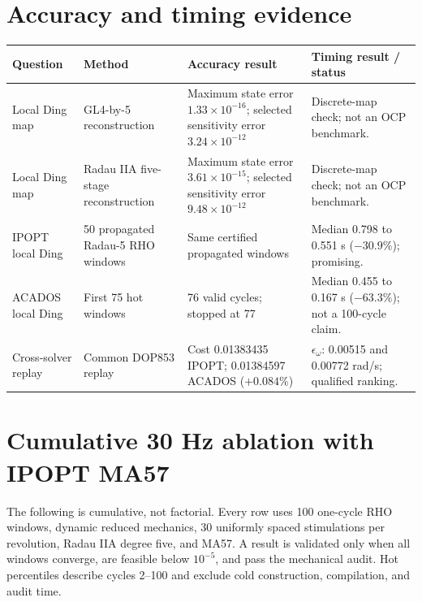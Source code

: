 \documentclass[10pt]{article}
\begin{document}
\section{Accuracy and timing evidence}

\begin{longtable}{@{}p{}p{}p{}p{}@{}}
\toprule
Question & Method & Accuracy result & Timing result / status\\
\midrule
\endhead
Local Ding map & GL4-by-5 reconstruction & Maximum state error $1.33\times10^{-16}$; selected sensitivity error $3.24\times10^{-12}$ & Discrete-map check; not an OCP benchmark.\\
Local Ding map & Radau IIA five-stage reconstruction & Maximum state error $3.61\times10^{-15}$; selected sensitivity error $9.48\times10^{-12}$ & Discrete-map check; not an OCP benchmark.\\
IPOPT local Ding & 50 propagated Radau-5 RHO windows & Same certified propagated windows & Median 0.798 to 0.551 s ($-30.9\%$); promising.\\
ACADOS local Ding & First 75 hot windows & 76 valid cycles; stopped at 77 & Median 0.455 to 0.167 s ($-63.3\%$); not a 100-cycle claim.\\
Cross-solver replay & Common DOP853 replay & Cost 0.01383435 IPOPT; 0.01384597 ACADOS ($+0.084\%$) & $\epsilon_\omega$: 0.00515 and 0.00772 rad/s; qualified ranking.\\
\bottomrule
\end{longtable}

\section{Cumulative 30 Hz ablation with IPOPT MA57}

The following is cumulative, not factorial. Every row uses 100 one-cycle RHO windows, dynamic reduced mechanics, 30 uniformly spaced stimulations per revolution, Radau IIA degree five, and MA57. A result is validated only when all windows converge, are feasible below $10^{-5}$, and pass the mechanical audit. Hot percentiles describe cycles 2--100 and exclude cold construction, compilation, and audit time.
\end{document}
